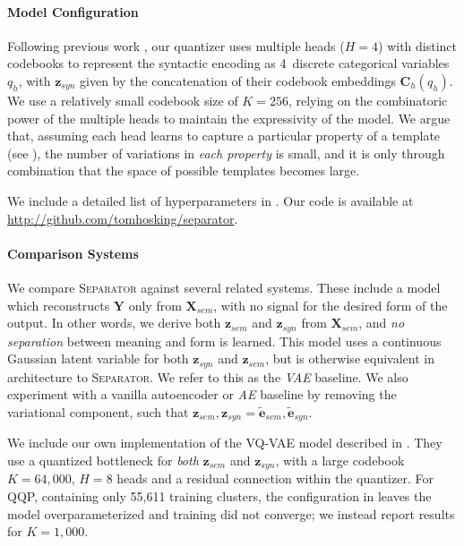 \documentclass[11pt,a4paper]{article}
\begin{document}
\paragraph{Model Configuration}

Following previous work
\cite{kaiser-latent-variables,angelidis2020extractive}, our quantizer uses
multiple heads ($H=4$) with distinct codebooks to represent the syntactic encoding as 4~discrete
categorical variables $q_h$, with $\textbf{z}_{syn}$ given by the
concatenation of their codebook embeddings $\textbf{C}_h(q_h)$. We use a relatively small
codebook size of $K=256$, relying on the combinatoric power of the
multiple heads to maintain the expressivity of the model. We argue
that, assuming each head learns to capture a particular property of a
template (see ), the number of variations in
\textit{each property} is small, and it is only through combination
that the space of possible templates becomes large.








We include a detailed list of hyperparameters in . Our code is available at \url{http://github.com/tomhosking/separator}.



\paragraph{Comparison Systems}

We compare \textsc{Separator} against several related systems.  These
include a model which reconstructs $\textbf{Y}$ only from
$\textbf{X}_{sem}$, with no signal for the desired form of the
output. In other words, we derive both $\textbf{z}_{sem}$ and
$\textbf{z}_{syn}$ from $\textbf{X}_{sem}$, and \textit{no separation}
between meaning and form is learned. This model uses a continuous
Gaussian latent variable for both $\textbf{z}_{syn}$ and
$\textbf{z}_{sem}$, but is otherwise equivalent in architecture to
\textsc{Separator}. We refer to this as the \textit{VAE} baseline. We
also experiment with a vanilla autoencoder or \textit{AE} baseline by
removing the variational component, such that $\textbf{z}_{sem},
\textbf{z}_{syn} = \tilde{\textbf{e}}_{sem},
\tilde{\textbf{e}}_{syn}$.

We include our own implementation of the \mbox{VQ-VAE} model described
in \citet{roy-grangier-2019-unsupervised}. They use a quantized
bottleneck for \textit{both} $\textbf{z}_{sem}$ and
$\textbf{z}_{syn}$, with a large codebook $K = 64,000$, $H = 8$ heads and a residual
connection within the quantizer. For QQP, containing only 55,611
training clusters, the configuration in
\citet{roy-grangier-2019-unsupervised} leaves the model
overparameterized and training did not converge; we instead report
results for $K = 1,000$.
\end{document}
